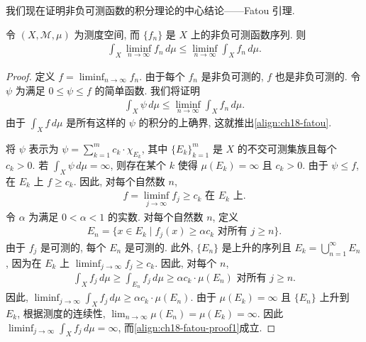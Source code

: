 \documentclass[../../main.tex]{subfiles}
\begin{document}
我们现在证明非负可测函数的积分理论的中心结论——Fatou 引理.

\begin{lemma}[Fatou]\label{lemma:ch18-fatou}
令 $(X,\mathcal{M},\mu)$ 为测度空间, 而 $\{f_{n}\}$ 是 $X$ 上的非负可测函数序列. 则
\begin{align}
\int_{X}\liminf_{n\to\infty}f_{n}\,d\mu\leqslant\liminf_{n\to\infty}\int_{X}f_{n}\,d\mu.\label{align:ch18-fatou}
\end{align}
\end{lemma}

\begin{proof}
定义 $f=\liminf_{n\to\infty}f_{n}$. 由于每个 $f_{n}$ 是非负可测的, $f$ 也是非负可测的. 令 $\psi$ 为满足 $0\leqslant\psi\leqslant f$ 的简单函数. 我们将证明
\begin{align}
\int_{X}\psi\,d\mu\leqslant\liminf_{n\to\infty}\int_{X}f_{n}\,d\mu.\label{align:ch18-fatou-proof1}
\end{align}
由于 $\int_{X}f\,d\mu$ 是所有这样的 $\psi$ 的积分的上确界, 这就推出\eqref{align:ch18-fatou}.

将 $\psi$ 表示为 $\psi=\sum_{k=1}^{m}c_{k}\cdot\chi_{E_{k}}$, 其中 $\{E_{k}\}_{k=1}^{m}$ 是 $X$ 的不交可测集族且每个 $c_{k}>0$. 若 $\int_{X}\psi\,d\mu=\infty$, 则存在某个 $k$ 使得 $\mu(E_{k})=\infty$ 且 $c_{k}>0$. 由于 $\psi\leqslant f$, 在 $E_{k}$ 上 $f\geqslant c_{k}$. 因此, 对每个自然数 $n$,
\begin{align*}
f=\liminf_{j\to\infty}f_{j}\geqslant c_{k}\text{ 在 }E_{k}\text{ 上}.
\end{align*}
令 $\alpha$ 为满足 $0<\alpha<1$ 的实数. 对每个自然数 $n$, 定义
\begin{align*}
E_{n}=\{x\in E_{k}\mid f_{j}(x)\geqslant\alpha c_{k}\text{ 对所有 }j\geqslant n\}.
\end{align*}
由于 $f_{j}$ 是可测的, 每个 $E_{n}$ 是可测的. 此外, $\{E_{n}\}$ 是上升的序列且 $E_{k}=\bigcup_{n=1}^{\infty}E_{n}$, 因为在 $E_{k}$ 上 $\liminf_{j\to\infty}f_{j}\geqslant c_{k}$. 因此, 对每个 $n$,
\begin{align*}
\int_{X}f_{j}\,d\mu\geqslant\int_{E_{n}}f_{j}\,d\mu\geqslant\alpha c_{k}\cdot\mu(E_{n})\text{ 对所有 }j\geqslant n.
\end{align*}
因此, $\liminf_{j\to\infty}\int_{X}f_{j}\,d\mu\geqslant\alpha c_{k}\cdot\mu(E_{n})$. 由于 $\mu(E_{k})=\infty$ 且 $\{E_{n}\}$ 上升到 $E_{k}$, 根据测度的连续性, $\lim_{n\to\infty}\mu(E_{n})=\mu(E_{k})=\infty$. 因此 $\liminf_{j\to\infty}\int_{X}f_{j}\,d\mu=\infty$, 而\eqref{align:ch18-fatou-proof1}成立.


\end{proof}
\end{document}
